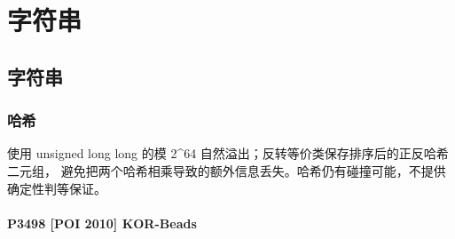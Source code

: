 \part{字符串}

\chapter{字符串}

\section{哈希}
使用 unsigned long long 的模 2\^{}64 自然溢出；反转等价类保存排序后的正反哈希二元组， 避免把两个哈希相乘导致的额外信息丢失。哈希仍有碰撞可能，不提供确定性判等保证。

\subsection{P3498 {[}POI 2010{]} KOR-Beads}\label{p3498-poi-2010-kor-beads}






